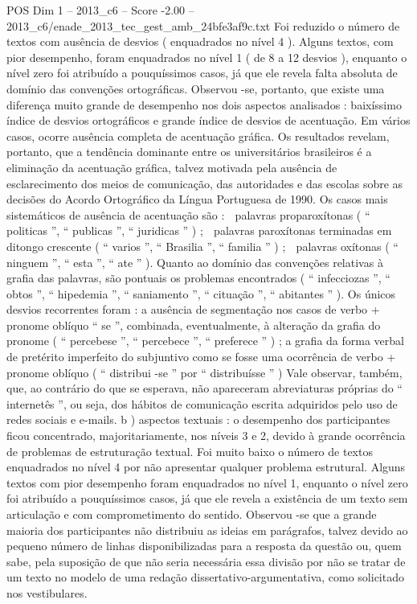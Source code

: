\begin{textsample}{POS Dim 1 – 2013\_c6 – Score -2.00 – 2013\_c6/enade\_2013\_tec\_gest\_amb\_24bfe3af9c.txt}
Foi reduzido o número de textos com ausência de desvios ( enquadrados no nível 4 ).
Alguns textos, com pior desempenho, foram enquadrados no nível 1 ( de 8 a 12 desvios ), enquanto o nível zero foi atribuído a pouquíssimos casos, já que ele revela falta absoluta de domínio das convenções ortográficas.
Observou -se, portanto, que existe uma diferença muito grande de desempenho nos dois aspectos analisados : baixíssimo índice de desvios ortográficos e grande índice de desvios de acentuação.
Em vários casos, ocorre ausência completa de acentuação gráfica.
Os resultados revelam, portanto, que a tendência dominante entre os universitários brasileiros é a eliminação da acentuação gráfica, talvez motivada pela ausência de esclarecimento dos meios de comunicação, das autoridades e das escolas sobre as decisões do Acordo Ortográfico da Língua Portuguesa de 1990.
Os casos mais sistemáticos de ausência de acentuação são :  palavras proparoxítonas ( “ politicas ”, “ publicas ”, “ juridicas ” ) ;  palavras paroxítonas terminadas em ditongo crescente ( “ varios ”, “ Brasilia ”, “ familia ” ) ;  palavras oxítonas ( “ ninguem ”, “ esta ”, “ ate ” ).
Quanto ao domínio das convenções relativas à grafia das palavras, são pontuais os problemas encontrados ( “ infecciozas ”, “ obtos ”, “ hipedemia ”, “ saniamento ”, “ cituação ”, “ abitantes ” ).
Os únicos desvios recorrentes foram : a ausência de segmentação nos casos de verbo + pronome oblíquo “ se ”, combinada, eventualmente, à alteração da grafia do pronome ( “ percebese ”, “ percebece ”, “ preferece ” ) ; a grafia da forma verbal de pretérito imperfeito do subjuntivo como se fosse uma ocorrência de verbo + pronome oblíquo ( “ distribui -se ” por “ distribuísse ” ) Vale observar, também, que, ao contrário do que se esperava, não apareceram abreviaturas próprias do “ internetês ”, ou seja, dos hábitos de comunicação escrita adquiridos pelo uso de redes sociais e e-mails. b ) aspectos textuais : o desempenho dos participantes ficou concentrado, majoritariamente, nos níveis 3 e 2, devido à grande ocorrência de problemas de estruturação textual.
Foi muito baixo o número de textos enquadrados no nível 4 por não apresentar qualquer problema estrutural.
Alguns textos com pior desempenho foram enquadrados no nível 1, enquanto o nível zero foi atribuído a pouquíssimos casos, já que ele revela a existência de um texto sem articulação e com comprometimento do sentido.
Observou -se que a grande maioria dos participantes não distribuiu as ideias em parágrafos, talvez devido ao pequeno número de linhas disponibilizadas para a resposta da questão ou, quem sabe, pela suposição de que não seria necessária essa divisão por não se tratar de um texto no modelo de uma redação dissertativo-argumentativa, como solicitado nos vestibulares.

\end{textsample}
